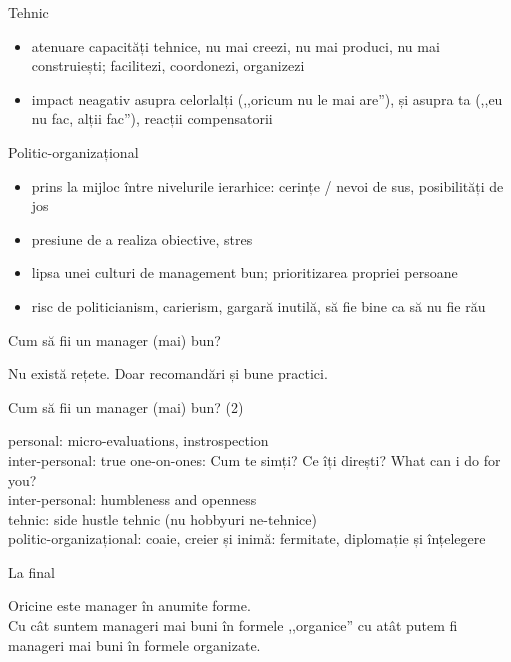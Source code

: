 \documentclass{simple}
\begin{document}
\begin{frame}{Tehnic}
  \begin{itemize}
    \pause
    \item atenuare capacități tehnice, nu mai creezi, nu mai produci, nu mai construiești; facilitezi, coordonezi, organizezi
    \pause
    \item impact neagativ asupra celorlalți (,,oricum nu le mai are''), și asupra ta (,,eu nu fac, alții fac''), reacții compensatorii
  \end{itemize}
\end{frame}

\begin{frame}{Politic-organizațional}
  \begin{itemize}
    \pause
    \item prins la mijloc între nivelurile ierarhice: cerințe / nevoi de sus, posibilități de jos
    \pause
    \item presiune de a realiza obiective, stres
    \pause
    \item lipsa unei culturi de management bun; prioritizarea propriei persoane
    \pause
    \item risc de politicianism, carierism, gargară inutilă, să fie bine ca să nu fie rău
  \end{itemize}
\end{frame}

\begin{frame}{Cum să fii un manager (mai) bun?}
  \begin{center}
    Nu există rețete. Doar recomandări și bune practici.
  \end{center}
\end{frame}

\begin{frame}{Cum să fii un manager (mai) bun? (2)}
  \begin{center}
    \pause
    personal: micro-evaluations, instrospection \\
    \vspace{1cm}
    \pause
    inter-personal: true one-on-ones: Cum te simți? Ce îți direști? What can i do for you? \\
    \pause
    inter-personal: humbleness and openness \\
    \vspace{1cm}
    \pause
    tehnic: side hustle tehnic (nu hobbyuri ne-tehnice) \\
    \vspace{1cm}
    \pause
    politic-organizațional: coaie, creier și inimă: fermitate, diplomație și înțelegere
  \end{center}
\end{frame}

\begin{frame}{La final}
  \begin{center}
    Oricine este manager în anumite forme. \\
    \vspace{1cm}
    Cu cât suntem manageri mai buni în formele ,,organice'' cu atât putem fi manageri mai buni în formele organizate.
  \end{center}
\end{frame}
\end{document}
